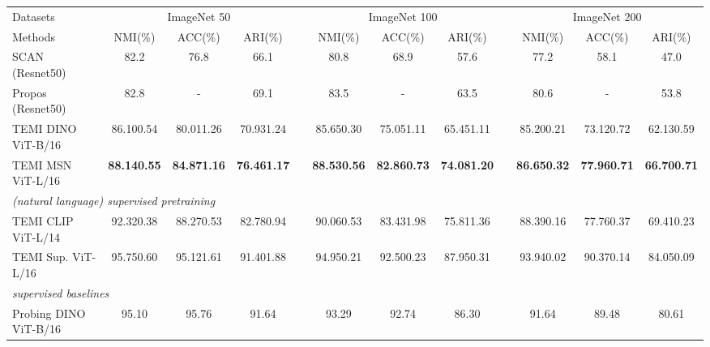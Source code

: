 \documentclass{bmvc2k}
\begin{document}
\begin{table*}
\begin{adjustbox}{width=0.95\columnwidth,center}
		\begin{tabular}{ l c c c c c c c c c c c }
			\toprule
			\multicolumn{1}{l}{Datasets} & \multicolumn{3}{c}{ImageNet 50} &      & \multicolumn{3}{c}{ImageNet 100} &      & \multicolumn{3}{c}{ImageNet 200} \\
			\cmidrule{2-4}\cmidrule{6-8}\cmidrule{10-12}    \multicolumn{1}{l}{Methods} & NMI(\%)  & ACC(\%) & ARI(\%) &      & NMI(\%) & ACC(\%) & ARI(\%) &      & NMI(\%) &ACC(\%)& ARI(\%)\\
				\hline
				
			SCAN (Resnet50) & 82.2 & 76.8 & 66.1 &      & 80.8 & 68.9 & 57.6 &      & 77.2 & 58.1 &	47.0 \\
  
  Propos (Resnet50)  & 82.8 & - & 69.1 &      &  83.5 & - & 63.5 &      & 80.6 & - & 53.8 \\

	\hline
TEMI DINO ViT-B/16 & 86.100.54 &  80.011.26 &  70.931.24 &      & 85.650.30 &  75.051.11 &  65.451.11 &      & 85.200.21 &  73.120.72 &  62.130.59 \\

TEMI MSN ViT-L/16 & \textbf{88.140.55} &  \textbf{84.871.16} &  \textbf{76.461.17} &      & \textbf{88.530.56} &  \textbf{82.860.73} &  \textbf{74.081.20} &      & \textbf{86.650.32} &  \textbf{77.960.71} &  \textbf{66.700.71} \\

\hline 
   \multicolumn{12}{l}{\textit{(natural language) supervised pretraining}}\\


TEMI CLIP ViT-L/14 & 92.320.38 &  88.270.53 &  82.780.94 &      & 90.060.53 &  83.431.98 &  75.811.36 &      & 88.390.16 &  77.760.37 &  69.410.23 \\

TEMI Sup. ViT-L/16 & 95.750.60 &  95.121.61 &  91.401.88 &      & 94.950.21 &  92.500.23 &  87.950.31 &      & 93.940.02 &  90.370.14 &  84.050.09 \\
	
  \hline
  \hline
     \multicolumn{12}{l}{\textit{supervised baselines}}\\
  
  \multicolumn{1}{l}{Probing DINO ViT-B/16 }  & 95.10 & 95.76 & 91.64 &     & 93.29 & 92.74 & 86.30 &      & 91.64 & 89.48 & 80.61 \\


\end{tabular}
\end{adjustbox}
\end{table*}
\end{document}
